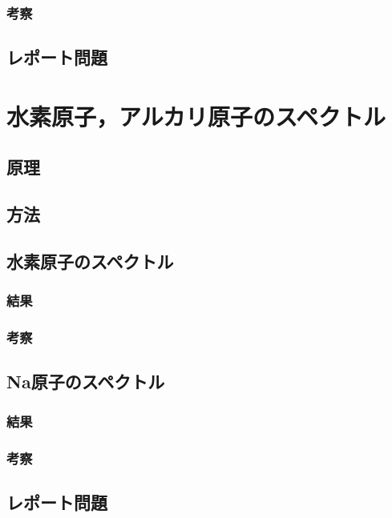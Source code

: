 \documentclass[uplatex,dvipdfmx,a4j,12pt]{jsarticle}
\begin{document}
\subsubsection{考察}

\subsection{レポート問題}

\newpage

\section{水素原子，アルカリ原子のスペクトル}
\subsection{原理}

\subsection{方法}

\subsection{水素原子のスペクトル}

\subsubsection{結果}

\subsubsection{考察}

\subsection{Na原子のスペクトル}

\subsubsection{結果}

\subsubsection{考察}

\subsection{レポート問題}
\end{document}
